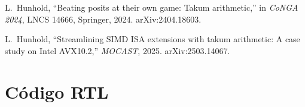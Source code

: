 \documentclass[11pt,a4paper]{article}
\newcommand{\srcfile}[3][Verilog2005]{%
  }
\begin{document}
\begin{thebibliography}{9}
L.~Hunhold, ``Beating posits at their own game: Takum arithmetic,'' in \emph{CoNGA 2024}, LNCS 14666,
Springer, 2024. arXiv:2404.18603.

L.~Hunhold, ``Streamlining SIMD ISA extensions with takum arithmetic: A case study on Intel AVX10.2,''
\emph{MOCAST}, 2025. arXiv:2503.14067.
\end{thebibliography}

\clearpage
\appendix
\section{Código RTL}

\srcfile{rtl/takum_hdr_dec.v}{cabeçalho de 12 bits}
\srcfile{rtl/takum_decoder.v}{decodificador}
\srcfile{rtl/takum_encoder.v}{codificador}
\srcfile{rtl/takum_alu.v}{ALU}
\srcfile{rtl/takum_vec_alu.v}{unidade vetorial}
\end{document}
